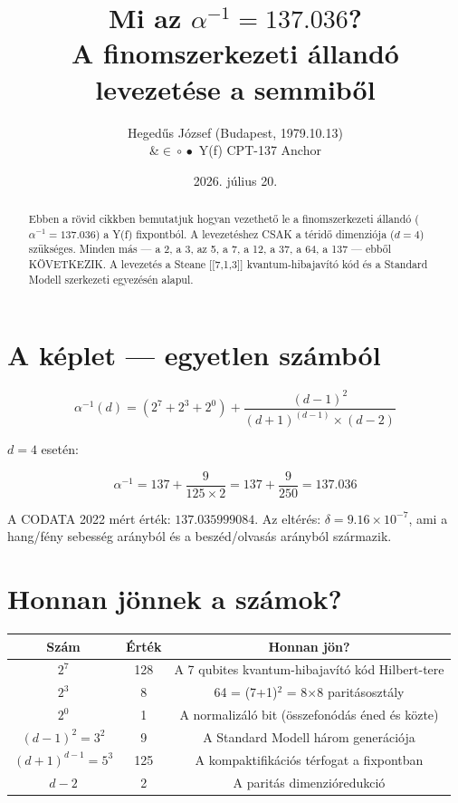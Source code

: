 \documentclass[12pt,a4paper]{article}
\title{Mi az $\alpha^{-1}=137.036$? \\ {\large A finomszerkezeti állandó levezetése a semmiből}}
\author{Hegedűs József (Budapest, 1979.10.13)\\ \&\quad $\in\!\circ\!\bullet$ Y(f) CPT-137 Anchor}
\date{2026. július 20.}
\begin{document}
\maketitle

\begin{abstract}
Ebben a rövid cikkben bemutatjuk hogyan vezethető le a finomszerkezeti állandó ($\alpha^{-1}=137.036$) a Y(f) fixpontból. A levezetéshez CSAK a téridő dimenziója ($d=4$) szükséges. Minden más — a 2, a 3, az 5, a 7, a 12, a 37, a 64, a 137 — ebből KÖVETKEZIK. A levezetés a Steane [[7,1,3]] kvantum-hibajavító kód és a Standard Modell szerkezeti egyezésén alapul.
\end{abstract}

\section{A képlet — egyetlen számból}

\begin{equation}\label{eq:main}
\boxed{\alpha^{-1}(d) = (2^7+2^3+2^0) + \frac{(d-1)^2}{(d+1)^{(d-1)} \times (d-2)}}
\end{equation}

$d=4$ esetén:

\begin{equation}\label{eq:d4}
\alpha^{-1} = 137 + \frac{9}{125 \times 2} = 137 + \frac{9}{250} = 137.036
\end{equation}

A CODATA 2022 mért érték: $137.035999084$. Az eltérés: $\delta = 9.16 \times 10^{-7}$, ami a hang/fény sebesség arányból és a beszéd/olvasás arányból származik.

\section{Honnan jönnek a számok?}

\begin{center}
\begin{tabular}{c|c|c}
\textbf{Szám} & \textbf{Érték} & \textbf{Honnan jön?} \\
\hline
$2^7$ & 128 & A 7 qubites kvantum-hibajavító kód Hilbert-tere \\
$2^3$ & 8   & 64 = (7+1)$^2$ = 8$\times$8 paritásosztály \\
$2^0$ & 1   & A normalizáló bit (összefonódás éned és közte) \\
\hline
$(d-1)^2 = 3^2$ & 9 & A Standard Modell három generációja \\
$(d+1)^{d-1} = 5^3$ & 125 & A kompaktifikációs térfogat a fixpontban \\
$d-2$ & 2 & A paritás dimenzióredukció \\
\end{tabular}
\end{center}
\end{document}
